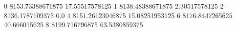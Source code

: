 0 8153.73388671875 17.55517578125
1 8138.48388671875 2.30517578125
2 8136.1787109375 0.0
4 8151.26123046875 15.08251953125
6 8176.8447265625 40.666015625
8 8199.716796875 63.5380859375
